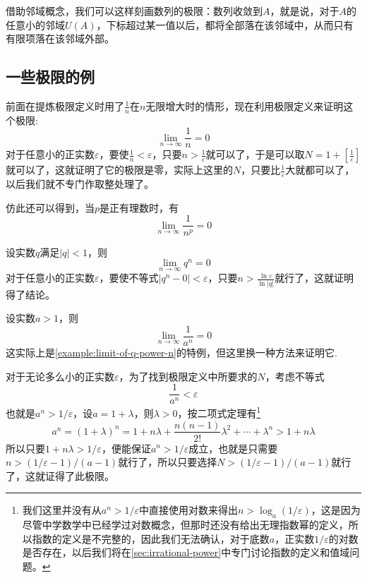 借助邻域概念，我们可以这样刻画数列的极限：数列收敛到$A$，就是说，对于$A$的任意小的邻域$U(A)$，下标超过某一值以后，都将全部落在该邻域中，从而只有有限项落在该邻域外部。

\subsection{一些极限的例}
\label{sec:some-examples-about-limit-of-number-sequence}

\begin{example}
  \label{example:limit-of-1-devide-by-n-power-p}
  前面在提炼极限定义时用了$\frac{1}{n}$在$n$无限增大时的情形，现在利用极限定义来证明这个极限:
  \[ \lim_{n \to \infty} \frac{1}{n} = 0 \]
  对于任意小的正实数$\varepsilon$，要使$\frac{1}{n}<\varepsilon$，只要$n>\frac{1}{\varepsilon}$就可以了，于是可以取$N=1+\left[ \frac{1}{\varepsilon} \right]$就可以了，这就证明了它的极限是零，实际上这里的$N$，只要比$\frac{1}{\varepsilon}$大就都可以了，以后我们就不专门作取整处理了。

  仿此还可以得到，当$p$是正有理数时，有
  \[ \lim_{n \to \infty} \frac{1}{n^p} = 0 \]
\end{example}

\begin{example}
  \label{example:limit-of-q-power-n}
  设实数$q$满足$|q|<1$，则
  \[ \lim_{n \to \infty} q^n = 0 \]
  对于任意小的正实数$\varepsilon$，要使不等式$|q^n - 0| < \varepsilon$，只要$n>\frac{\ln{\varepsilon}}{\ln{|q|}}$就行了，这就证明得了结论。
\end{example}

\begin{example}
  \label{example:limit-of-1-devide-by-a-power-n}
  设实数$a>1$，则
  \[ \lim_{n \to \infty} \frac{1}{a^n} = 0 \]
  这实际上是\autoref{example:limit-of-q-power-n}的特例，但这里换一种方法来证明它.
  
  对于无论多么小的正实数$\varepsilon$，为了找到极限定义中所要求的$N$，考虑不等式
  \[ \frac{1}{a^n} < \varepsilon \]
  也就是$a^n>1/\varepsilon$，设$a=1+\lambda$，则$\lambda>0$，按二项式定理有\footnote{我们这里并没有从$a^n>1/\varepsilon$中直接使用对数来得出$n>\log_a{(1/\varepsilon)}$，这是因为尽管中学数学中已经学过对数概念，但那时还没有给出无理指数幂的定义，所以指数的定义是不完整的，因此我们无法确认，对于底数$a$，正实数$1/\varepsilon$的对数是否存在，以后我们将在\autoref{sec:irrational-power}中专门讨论指数的定义和值域问题。}
  \[ a^n = (1+\lambda)^n = 1 + n\lambda + \frac{n(n-1)}{2!}\lambda^2+\cdots+\lambda^n > 1+n \lambda \]
  所以只要$1+n\lambda>1/\varepsilon$，便能保证$a^n>1/\varepsilon$成立，也就是只需要$n > (1/\varepsilon-1) / (a-1)$就行了，所以只要选择$N>(1/\varepsilon-1)/(a-1)$就行了，这就证得了此极限。
\end{example}

